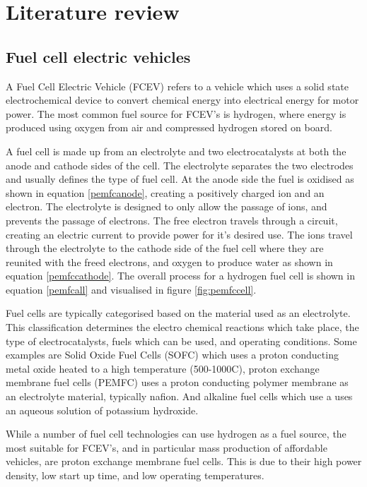 
\chapter{Literature review}

\section{Fuel cell electric vehicles}
A Fuel Cell Electric Vehicle (FCEV) refers to a vehicle which uses a solid state electrochemical device to convert chemical energy into electrical energy for motor power. The most common fuel source for FCEV's is hydrogen, where energy is produced using oxygen from air and compressed hydrogen stored on board. 

A fuel cell is made up from an electrolyte and two electrocatalysts at both the anode and cathode sides of the cell. The electrolyte separates the two electrodes and usually defines the type of fuel cell. At the anode side the fuel is oxidised as shown in equation \ref{pemfcanode}, creating a positively charged ion and an electron. The electrolyte is designed to only allow the passage of ions, and prevents the passage of electrons. The free electron travels through a circuit, creating an electric current to provide power for it's desired use. The ions travel through the electrolyte to the cathode side of the fuel cell where they are reunited with the freed electrons, and oxygen to produce water as shown in equation \ref{pemfccathode}. The overall process for a hydrogen fuel cell is shown in equation \ref{pemfcall} and visualised in figure \ref{fig:pemfccell}. 

Fuel cells are typically categorised based on the material used as an electrolyte. This classification determines the electro chemical reactions which take place, the type of electrocatalysts, fuels which can be used, and operating conditions. Some examples are Solid Oxide Fuel Cells (SOFC) which uses a proton conducting metal oxide heated to a high temperature (500-1000\textdegree C), proton exchange membrane fuel cells (PEMFC) uses a proton conducting polymer membrane as an electrolyte material, typically nafion. And alkaline fuel cells which use a uses an aqueous solution of potassium hydroxide.  

While a number of fuel cell technologies can use hydrogen as a fuel source, the most suitable for FCEV's, and in particular mass production of affordable vehicles, are proton exchange membrane fuel cells. This is due to their high power density, low start up time, and low operating temperatures. \cite{Alaswad2016}

